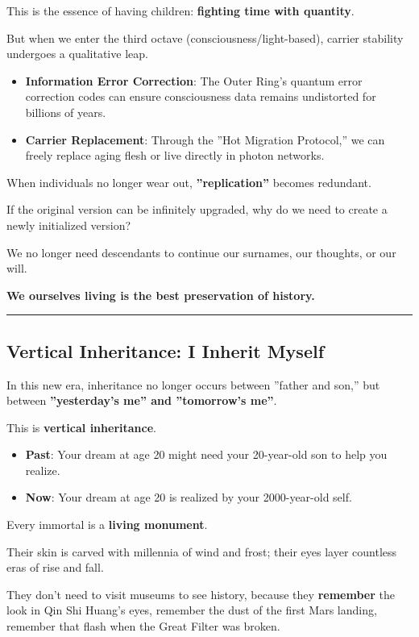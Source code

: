 This is the essence of having children: \textbf{fighting time with quantity}.

But when we enter the third octave (consciousness/light-based), carrier stability undergoes a qualitative leap.

\begin{itemize}
\item \textbf{Information Error Correction}: The Outer Ring's quantum error correction codes can ensure consciousness data remains undistorted for billions of years.

\item \textbf{Carrier Replacement}: Through the ''Hot Migration Protocol,'' we can freely replace aging flesh or live directly in photon networks.
\end{itemize}

When individuals no longer wear out, \textbf{''replication''} becomes redundant.

If the original version can be infinitely upgraded, why do we need to create a newly initialized version?

We no longer need descendants to continue our surnames, our thoughts, or our will.

\textbf{We ourselves living is the best preservation of history.}

\hrule

\subsection{Vertical Inheritance: I Inherit Myself}

In this new era, inheritance no longer occurs between ''father and son,'' but between \textbf{''yesterday's me'' and ''tomorrow's me''}.

This is \textbf{vertical inheritance}.

\begin{itemize}
\item \textbf{Past}: Your dream at age 20 might need your 20-year-old son to help you realize.

\item \textbf{Now}: Your dream at age 20 is realized by your 2000-year-old self.
\end{itemize}

Every immortal is a \textbf{living monument}.

Their skin is carved with millennia of wind and frost; their eyes layer countless eras of rise and fall.

They don't need to visit museums to see history, because they \textbf{remember} the look in Qin Shi Huang's eyes, remember the dust of the first Mars landing, remember that flash when the Great Filter was broken.

